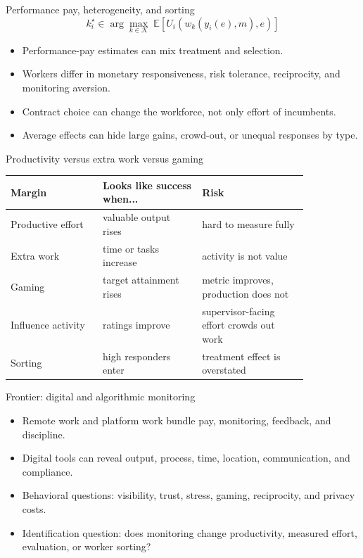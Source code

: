 \documentclass[aspectratio=169,11pt]{beamer}
\begin{document}
\begin{frame}{Performance pay, heterogeneity, and sorting}
\[
k_i^\star \in \arg\max_{k \in \mathcal{K}}
 \; \mathbb{E}\!\left[U_i\!\left(w_k(y_i(e),m), e\right)\right]
\]

\begin{itemize}
    \item Performance-pay estimates can mix treatment and selection.
    \item Workers differ in monetary responsiveness, risk tolerance, reciprocity, and monitoring aversion.
    \item Contract choice can change the workforce, not only effort of incumbents.
    \item Average effects can hide large gains, crowd-out, or unequal responses by type.
\end{itemize}
\end{frame}

\begin{frame}{Productivity versus extra work versus gaming}
\small
\begin{tabular}{p{0.26\linewidth} p{0.28\linewidth} p{0.30\linewidth}}
\toprule
Margin & Looks like success when... & Risk \\
\midrule
Productive effort & valuable output rises & hard to measure fully \\
Extra work & time or tasks increase & activity is not value \\
Gaming & target attainment rises & metric improves, production does not \\
Influence activity & ratings improve & supervisor-facing effort crowds out work \\
Sorting & high responders enter & treatment effect is overstated \\
\bottomrule
\end{tabular}
\end{frame}

\begin{frame}{Frontier: digital and algorithmic monitoring}
\begin{itemize}
    \item Remote work and platform work bundle pay, monitoring, feedback, and discipline.
    \item Digital tools can reveal output, process, time, location, communication, and compliance.
    \item Behavioral questions: visibility, trust, stress, gaming, reciprocity, and privacy costs.
    \item Identification question: does monitoring change productivity, measured effort, evaluation, or worker sorting?
\end{itemize}
\end{frame}
\end{document}
